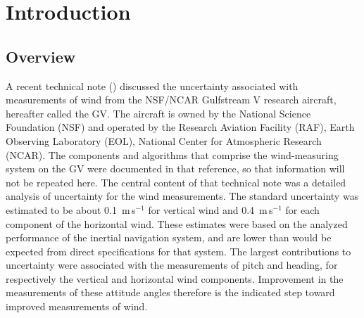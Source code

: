 \documentclass[12pt,twoside,english,12pt,twoside,english]{article}\usepackage[]{graphicx}\usepackage[]{color}
\let\stdsection\section
\renewcommand{\section}{\newpage\stdsection}
\let\OrgIndex\index
\renewcommand*{\index}[1]{\OrgIndex{#1}}
\begin{document}
\thispagestyle{plain}\clearpage{}

\thispagestyle{empty}

\cleardoublepage{}


\section{Introduction}

\subsection{Overview}

A recent technical note (\citet{Cooper2016ncartn})
discussed the uncertainty associated with
measurements of wind from the NSF/NCAR Gulfstream
V
research aircraft, hereafter called the GV.
The aircraft is owned by the National
Science Foundation (NSF) and operated by the Research Aviation Facility
(RAF), Earth Observing Laboratory (EOL), National Center for Atmospheric
Research
(NCAR).  The components and algorithms
that comprise the wind-measuring system on the
GV were documented in that
reference, so that information will not be repeated here. The central
content of that technical note was a detailed analysis of uncertainty
for the wind measurements. The standard
uncertainty was estimated to be about 0.1~m\,s$^{-1}$ for vertical
wind
and 0.4~m\,s$^{-1}$ for each component of the horizontal wind.
These estimates were based on the
analyzed performance of the inertial navigation system,
and are lower than would be expected from direct specifications for
that system. The largest contributions to uncertainty
were associated with the measurements of pitch and heading,
for respectively the vertical and horizontal wind components. Improvement
in the measurements of these attitude
angles therefore is the indicated step toward improved measurements
of wind.
\end{document}
